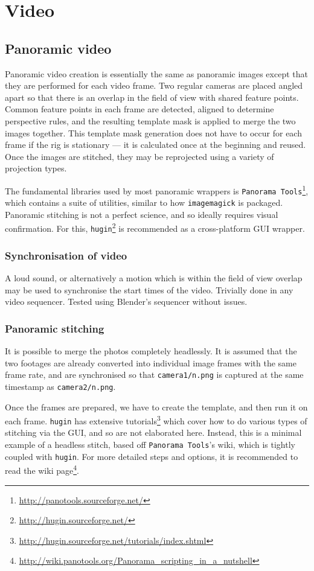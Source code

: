 \section{Video}
\subsection{Panoramic video}
Panoramic video creation is essentially the same as panoramic images except that they are performed for each video frame. Two regular cameras are placed angled apart so that there is an overlap in the field of view with shared feature points. Common feature points in each frame are detected, aligned to determine perspective rules, and the resulting template mask is applied to merge the two images together. This template mask generation does not have to occur for each frame if the rig is stationary --- it is calculated once at the beginning and reused. Once the images are stitched, they may be reprojected using a variety of projection types.

The fundamental libraries used by most panoramic wrappers is {\tt Panorama Tools}\footnote{\url{http://panotools.sourceforge.net/}}, which contains a suite of utilities, similar to how {\tt imagemagick} is packaged. Panoramic stitching is not a perfect science, and so ideally requires visual confirmation. For this, {\tt hugin}\footnote{\url{http://hugin.sourceforge.net/}} is recommended as a cross-platform GUI wrapper.

\subsubsection{Synchronisation of video}

A loud sound, or alternatively a motion which is within the field of view overlap may be used to synchronise the start times of the video. Trivially done in any video sequencer. Tested using Blender's sequencer without issues.

\subsubsection{Panoramic stitching}

It is possible to merge the photos completely headlessly. It is assumed that the two footages are already converted into individual image frames with the same frame rate, and are synchronised so that {\tt camera1/n.png} is captured at the same timestamp as {\tt camera2/n.png}.

Once the frames are prepared, we have to create the template, and then run it on each frame. {\tt hugin} has extensive tutorials\footnote{\url{http://hugin.sourceforge.net/tutorials/index.shtml}} which cover how to do various types of stitching via the GUI, and so are not elaborated here. Instead, this is a minimal example of a headless stitch, based off {\tt Panorama Tools}'s wiki, which is tightly coupled with {\tt hugin}. For more detailed steps and options, it is recommended to read the wiki page\footnote{\url{http://wiki.panotools.org/Panorama_scripting_in_a_nutshell}}.

